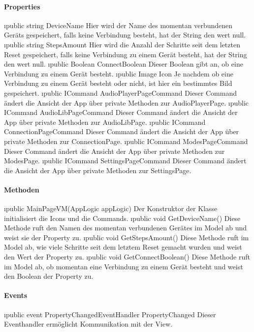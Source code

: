 \documentclass[../entwurf.tex]{subfiles}
\begin{document}
\paragraph{Properties}
\begin{itemize}
	\i{public string DeviceName} Hier wird der Name des momentan verbundenen Geräts gespeichert, falls keine Verbindung besteht, hat der String den wert null.
	\i{public string StepsAmount} Hier wird die Anzahl der Schritte seit dem letzten Reset gespeichert, falls keine Verbindung zu einem Gerät besteht, hat der String den wert null.
	\i{public Boolean ConnectBoolean} Dieser Boolean gibt an, ob eine Verbindung zu einem Gerät besteht.
	\i{public Image Icon} Je nachdem ob eine Verbindung zu einem Gerät besteht oder nicht, ist hier ein bestimmtes Bild gespeichert.
	\i{public ICommand AudioPlayerPageCommand} Dieser Command ändert die Ansicht der App über private Methoden zur AudioPlayerPage. 
	\i{public ICommand AudioLibPageCommand} Dieser Command ändert die Ansicht der App über private Methoden zur AudioLibPage. 
	\i{public ICommand ConnectionPageCommand} Dieser Command ändert die Ansicht der App über private Methoden zur ConnectionPage. 
	\i{public ICommand ModesPageCommand} Dieser Command ändert die Ansicht der App über private Methoden zur ModesPage. 
	\i{public ICommand SettingsPageCommand} Dieser Command ändert die Ansicht der App über private Methoden zur SettingsPage. 
\end{itemize}
\paragraph{Methoden}
\begin{itemize}
	\i{public MainPageVM(AppLogic appLogic)} Der Konstruktor der Klasse initialisiert die Icons und die Commands.
	\i{public void GetDeviceName()} Diese Methode ruft den Namen des momentan verbundenen Gerätes im Model ab und weist sie der Property  zu.
	\i{public void GetStepsAmount()} Diese Methode ruft im Model ab, wie viele Schritte seit dem letztem Reset gemacht wurden und weist den Wert der Property  zu.
	\i{public void GetConnectBoolean()} Diese Methode ruft im Model ab, ob momentan eine Verbindung zu einem Gerät besteht und weist den Boolean der Property  zu.
\end{itemize}
\paragraph{Events}
\begin{itemize}
	\i{public event PropertyChangedEventHandler PropertyChanged} Dieser 	Eventhandler ermöglicht Kommunikation mit der View.
\end{itemize}
\end{document}
